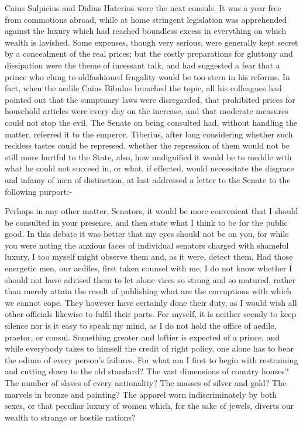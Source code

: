 Caius Sulpicius and Didius Haterius were the next consuls. It was a year free from commotions abroad, while at home stringent legislation was apprehended against the luxury which had reached boundless excess in everything on which wealth is lavished. Some expenses, though very serious, were generally kept secret by a concealment of the real prices; but the costly preparations for gluttony and dissipation were the theme of incessant talk, and had suggested a fear that a prince who clung to oldfashioned frugality would be too stern in his reforms. In fact, when the aedile Caius Bibulus broached the topic, all his colleagues had pointed out that the sumptuary laws were disregarded, that prohibited prices for household articles were every day on the increase, and that moderate measures could not stop the evil. The Senate on being consulted had, without handling the matter, referred it to the emperor. Tiberius, after long considering whether such reckless tastes could be repressed, whether the repression of them would not be still more hurtful to the State, also, how undignified it would be to meddle with what he could not succeed in, or what, if effected, would necessitate the disgrace and infamy of men of distinction, at last addressed a letter to the Senate to the following purport:-


Perhaps in any other matter, Senators, it would be more convenient that I should be consulted in your presence, and then state what I think to be for the public good. In this debate it was better that my eyes should not be on you, for while you were noting the anxious faces of individual senators charged with shameful luxury, I too myself might observe them and, as it were, detect them. Had those energetic men, our aediles, first taken counsel with me, I do not know whether I should not have advised them to let alone vices so strong and so matured, rather than merely attain the result of publishing what are the corruptions with which we cannot cope. They however have certainly done their duty, as I would wish all other officials likewise to fulfil their parts. For myself, it is neither seemly to keep silence nor is it easy to speak my mind, as I do not hold the office of aedile, praetor, or consul. Something greater and loftier is expected of a prince, and while everybody takes to himself the credit of right policy, one alone has to bear the odium of every person's failures. For what am I first to begin with restraining and cutting down to the old standard? The vast dimensions of country houses? The number of slaves of every nationality? The masses of silver and gold? The marvels in bronze and painting? The apparel worn indiscriminately by both sexes, or that peculiar luxury of women which, for the sake of jewels, diverts our wealth to strange or hostile nations?

